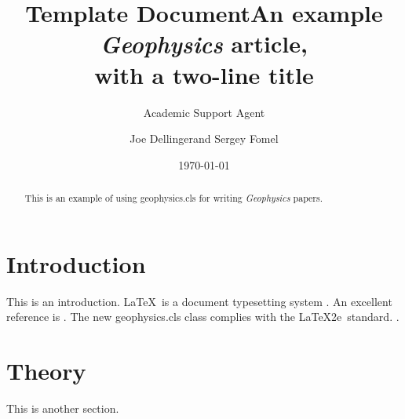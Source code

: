 \documentclass{article}
\title{Template Document}
\author{Academic Support Agent}
\date{\today}
\begin{document}
\maketitle

\title{An example \emph{Geophysics} article, \\ with a two-line title}

\renewcommand{\thefootnote}{\fnsymbol{footnote}} 


\address{
\footnotemark[1]BP UTG, \\
200 Westlake Park Blvd, \\
Houston, TX, 77079 \\
\footnotemark[2]Bureau of Economic Geology, \\
John A. and Katherine G. Jackson School of Geosciences \\
The University of Texas at Austin \\
University Station, Box X \\
Austin, TX 78713-8924}
\author{Joe Dellinger\footnotemark[1] and Sergey Fomel\footnotemark[2]}


\maketitle

\begin{abstract}
  This is an example of using \textsf{geophysics.cls} for writing
  \emph{Geophysics} papers.
\end{abstract}

\section{Introduction}

This is an introduction. \LaTeX\ is a  document
typesetting system \cite[]{lamport}. An excellent reference is
\cite[]{kopka}. The new \textsf{geophysics.cls} class complies with
the \LaTeX2e\ standard. .

\section*{Theory}

This is another section. 
\end{document}

